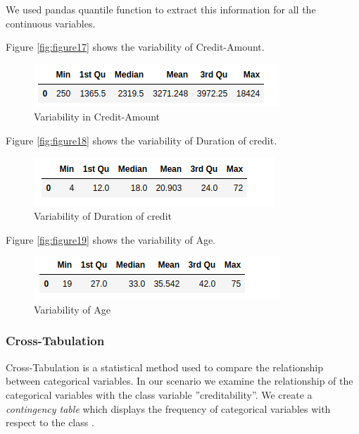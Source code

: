 \documentclass[sigconf]{acmart}
\begin{document}
We used pandas quantile function to extract this information for all the continuous variables.

Figure \ref{fig:figure17} shows the variability of Credit-Amount.

\begin{figure}[htb]
  \centering
  \includegraphics[width=1.0\columnwidth]{images/Figure17.png}
  \caption{Variability in Credit-Amount}
  \label{fig:Figure17} 
\end{figure}

Figure \ref{fig:figure18} shows the variability of Duration of credit.

\begin{figure}[htb]
  \centering
  \includegraphics[width=1.0\columnwidth]{images/Figure18.png}
  \caption{Variability of Duration of credit}
  \label{fig:Figure18} 
\end{figure}

Figure \ref{fig:figure19} shows the variability of Age.

\begin{figure}[htb]
  \centering
  \includegraphics[width=1.0\columnwidth]{images/Figure19.png}
  \caption{Variability of Age}
  \label{fig:Figure19} 
\end{figure}

\subsubsection{Cross-Tabulation}

Cross-Tabulation is a statistical method used to compare the relationship between categorical variables. In our scenario we examine the relationship of the categorical variables with the class variable ''creditability''. We create a \emph{contingency table} which displays the frequency of categorical variables with respect to the class \cite{cross-tabulation}. 
\end{document}
